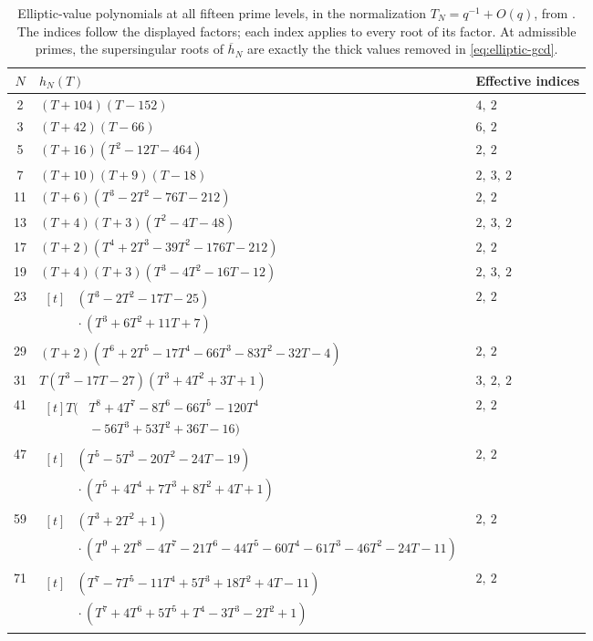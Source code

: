 \begin{table}[p]\centering\small
\setlength{\tabcolsep}{4pt}
\begin{tabular}{cll}\toprule
$N$ & $h_N(T)$ & Effective indices\\\midrule
2 & $(T+104)(T-152)$ & $4,\ 2$\\[3pt]
3 & $(T+42)(T-66)$ & $6,\ 2$\\[3pt]
5 & $(T+16)(T^{2}-12T-464)$ & $2,\ 2$\\[3pt]
7 & $(T+10)(T+9)(T-18)$ & $2,\ 3,\ 2$\\[3pt]
11 & $(T+6)(T^{3}-2T^{2}-76T-212)$ & $2,\ 2$\\[3pt]
13 & $(T+4)(T+3)(T^{2}-4T-48)$ & $2,\ 3,\ 2$\\[3pt]
17 & $(T+2)(T^{4}+2T^{3}-39T^{2}-176T-212)$ & $2,\ 2$\\[3pt]
19 & $(T+4)(T+3)(T^{3}-4T^{2}-16T-12)$ & $2,\ 3,\ 2$\\[3pt]
23 & $\begin{aligned}[t]&(T^{3}-2T^{2}-17T-25)\\[-1pt]&{}\cdot(T^{3}+6T^{2}+11T+7)\end{aligned}$ & $2,\ 2$\\[3pt]
29 & $(T+2)(T^{6}+2T^{5}-17T^{4}-66T^{3}-83T^{2}-32T-4)$ & $2,\ 2$\\[3pt]
31 & $T(T^{3}-17T-27)(T^{3}+4T^{2}+3T+1)$ & $3,\ 2,\ 2$\\[3pt]
41 & $\begin{aligned}[t]T\bigl(&T^8+4T^7-8T^6-66T^5-120T^4\\[-1pt]&{}-56T^3+53T^2+36T-16\bigr)\end{aligned}$ & $2,\ 2$\\[3pt]
47 & $\begin{aligned}[t]&(T^{5}-5T^{3}-20T^{2}-24T-19)\\[-1pt]&{}\cdot(T^{5}+4T^{4}+7T^{3}+8T^{2}+4T+1)\end{aligned}$ & $2,\ 2$\\[3pt]
59 & $\begin{aligned}[t]&(T^{3}+2T^{2}+1)\\[-1pt]&{}\cdot(T^{9}+2T^{8}-4T^{7}-21T^{6}-44T^{5}-60T^{4}-61T^{3}-46T^{2}-24T-11)\end{aligned}$ & $2,\ 2$\\[3pt]
71 & $\begin{aligned}[t]&(T^{7}-7T^{5}-11T^{4}+5T^{3}+18T^{2}+4T-11)\\[-1pt]&{}\cdot(T^{7}+4T^{6}+5T^{5}+T^{4}-3T^{3}-2T^{2}+1)\end{aligned}$ & $2,\ 2$\\[3pt]
\bottomrule\end{tabular}
\caption{Elliptic-value polynomials at all fifteen prime levels, in the
normalization $T_N=q^{-1}+O(q)$, from \citet[\S4.2, Table~1]{JST19}.
The indices follow the displayed factors; each index applies to every root
of its factor. At admissible primes, the supersingular roots of
$\overline h_N$ are exactly the thick values removed in
\eqref{eq:elliptic-gcd}.}
\label{tab:elliptic-values}
\end{table}
